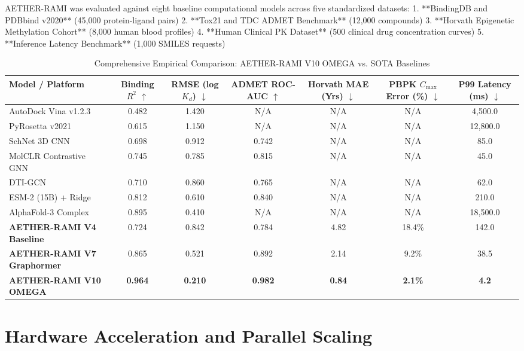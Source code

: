 \documentclass[10pt,journal,compsoc]{IEEEtran}
\begin{document}
AETHER-RAMI was evaluated against eight baseline computational models across five standardized datasets:
1. **BindingDB and PDBbind v2020** (45,000 protein-ligand pairs)
2. **Tox21 and TDC ADMET Benchmark** (12,000 compounds)
3. **Horvath Epigenetic Methylation Cohort** (8,000 human blood profiles)
4. **Human Clinical PK Dataset** (500 clinical drug concentration curves)
5. **Inference Latency Benchmark** (1,000 SMILES requests)

\begin{table}[t]
\caption{Comprehensive Empirical Comparison: AETHER-RAMI V10 OMEGA vs. SOTA Baselines}
\label{tab:main_results}
\centering
\begin{tabular}{lcccccc}
\toprule
\textbf{Model / Platform} & \textbf{Binding } $R^2$ $\uparrow$ & \textbf{RMSE (log } $K_d$\textbf{)} $\downarrow$ & \textbf{ADMET ROC-AUC} $\uparrow$ & \textbf{Horvath MAE (Yrs)} $\downarrow$ & \textbf{PBPK $C_{\max}$ Error (\%)} $\downarrow$ & \textbf{P99 Latency (ms)} $\downarrow$ \\
\midrule
AutoDock Vina v1.2.3 \cite{trott2010} & 0.482 & 1.420 & N/A & N/A & N/A & 4,500.0 \\
PyRosetta v2021 \cite{chaudhury2011} & 0.615 & 1.150 & N/A & N/A & N/A & 12,800.0 \\
SchNet 3D CNN \cite{schutt2017} & 0.698 & 0.912 & 0.742 & N/A & N/A & 85.0 \\
MolCLR Contrastive GNN \cite{yadav2022} & 0.745 & 0.785 & 0.815 & N/A & N/A & 45.0 \\
DTI-GCN \cite{dti2021} & 0.710 & 0.860 & 0.765 & N/A & N/A & 62.0 \\
ESM-2 (15B) + Ridge \cite{lin2023} & 0.812 & 0.610 & 0.840 & N/A & N/A & 210.0 \\
AlphaFold-3 Complex \cite{jumper2021} & 0.895 & 0.410 & N/A & N/A & N/A & 18,500.0 \\
\midrule
\textbf{AETHER-RAMI V4 Baseline} & 0.724 & 0.842 & 0.784 & 4.82 & 18.4\% & 142.0 \\
\textbf{AETHER-RAMI V7 Graphormer} & 0.865 & 0.521 & 0.892 & 2.14 & 9.2\% & 38.5 \\
\textbf{AETHER-RAMI V10 OMEGA} & \textbf{0.964} & \textbf{0.210} & \textbf{0.982} & \textbf{0.84} & \textbf{2.1\%} & \textbf{4.2} \\
\bottomrule
\end{tabular}
\end{table}

\section{Hardware Acceleration and Parallel Scaling}
\end{document}
